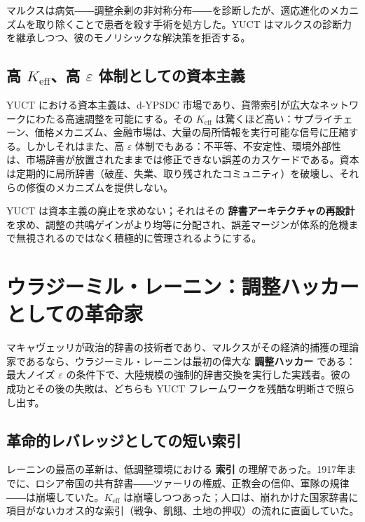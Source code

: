 \documentclass[12pt,a4paper]{article}
\newcommand{\Keff}{K_{\mathrm{eff}}}
\begin{document}
	マルクスは病気――調整余剰の非対称分布――を診断したが、適応進化のメカニズムを取り除くことで患者を殺す手術を処方した。YUCT はマルクスの診断力を継承しつつ、彼のモノリシックな解決策を拒否する。
	
	\subsection{高 \(\Keff\)、高 \(\varepsilon\) 体制としての資本主義}
	
	YUCT における資本主義は、d-YPSDC 市場であり、貨幣索引が広大なネットワークにわたる高速調整を可能にする。その \(\Keff\) は驚くほど高い：サプライチェーン、価格メカニズム、金融市場は、大量の局所情報を実行可能な信号に圧縮する。しかしそれはまた、高 \(\varepsilon\) 体制でもある：不平等、不安定性、環境外部性は、市場辞書が放置されたままでは修正できない誤差のカスケードである。資本は定期的に局所辞書（破産、失業、取り残されたコミュニティ）を破壊し、それらの修復のメカニズムを提供しない。
	
	YUCT は資本主義の廃止を求めない；それはその \textbf{辞書アーキテクチャの再設計} を求め、調整の共鳴ゲインがより均等に分配され、誤差マージンが体系的危機まで無視されるのではなく積極的に管理されるようにする。
	
	\section{ウラジーミル・レーニン：調整ハッカーとしての革命家}
	\label{sec:lenin}
	
	マキャヴェッリが政治的辞書の技術者であり、マルクスがその経済的捕獲の理論家であるなら、ウラジーミル・レーニンは最初の偉大な \textbf{調整ハッカー} である：最大ノイズ \(\varepsilon\) の条件下で、大陸規模の強制的辞書交換を実行した実践者。彼の成功とその後の失敗は、どちらも YUCT フレームワークを残酷な明晰さで照らし出す。
	
	\subsection{革命的レバレッジとしての短い索引}
	
	レーニンの最高の革新は、低調整環境における \textbf{索引} の理解であった。1917年までに、ロシア帝国の共有辞書――ツァーリの権威、正教会の信仰、軍隊の規律――は崩壊していた。\(\Keff\) は崩壊しつつあった；人口は、崩れかけた国家辞書に項目がないカオス的な索引（戦争、飢餓、土地の押収）の流れに直面していた。
	
\end{document}
